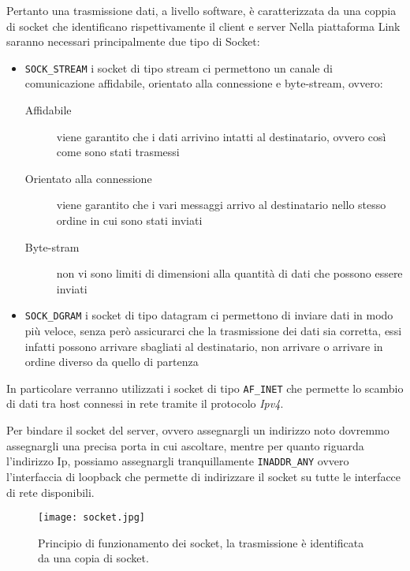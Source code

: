 \documentclass[11pt,fleqn]{book} %
\begin{document}
Pertanto una trasmissione dati, a livello software, è caratterizzata da una coppia di socket che identificano rispettivamente il client e server
Nella piattaforma Link saranno necessari principalmente due tipo di Socket:
\begin{itemize}
	\item  \texttt{SOCK\_STREAM} i socket di tipo stream ci permettono un canale di comunicazione affidabile, orientato alla connessione e byte-stream, ovvero:
	\begin{description}
		\item [Affidabile] viene garantito che i dati arrivino intatti al destinatario, ovvero così come sono stati trasmessi
		\item [Orientato alla connessione] viene garantito che i vari messaggi arrivo al destinatario nello stesso ordine in cui sono stati inviati
		\item [Byte-stram] non vi sono limiti di dimensioni alla quantità di dati che possono essere inviati
	\end{description}
	\obeylines
	\item	\texttt{SOCK\_DGRAM} i socket di tipo datagram ci permettono di inviare dati in modo più veloce, senza però assicurarci che la trasmissione dei dati sia corretta, essi infatti possono arrivare sbagliati al destinatario, non arrivare o arrivare in ordine diverso da quello di partenza
\end{itemize}
In particolare verranno utilizzati i socket di tipo \texttt{AF\_INET} che permette lo scambio di dati tra host connessi in rete tramite il protocolo \textit{Ipv4}.

Per bindare il socket del server, ovvero assegnargli un indirizzo noto dovremmo assegnargli una precisa porta in cui ascoltare, mentre per quanto riguarda l'indirizzo Ip, possiamo assegnargli tranquillamente \texttt{INADDR\_ANY} ovvero l'interfaccia di loopback che permette di indirizzare il socket su tutte le interfacce di rete disponibili.


\begin{figure}[h]
    \centering
    \texttt{[image: socket.jpg]}
    \caption{Principio di funzionamento dei socket, la trasmissione è identificata da una copia di socket.}
    \label{fig:awesome_image}
\end{figure}
\end{document}
